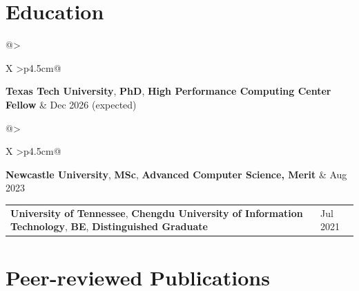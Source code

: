 \documentclass[10pt, letterpaper]{article}
\makeatletter
\newcommand{\datedentry}[2]{%
    \begin{tabularx}{\linewidth}{@{}>{\raggedright\arraybackslash}X
                                  >{\raggedleft\arraybackslash}p{4.5cm}@{}}
        #1 & #2
    \end{tabularx}%
}
\makeatother
\begin{document}
\section{Education}

\datedentry{\textbf{Texas Tech University}, \textbf{PhD}, \textbf{High Performance Computing Center Fellow}}{Dec 2026 (expected)}

\vspace{0.2cm}
\datedentry{\textbf{Newcastle University}, \textbf{MSc}, \textbf{Advanced Computer Science, Merit}}{Aug 2023}

\vspace{0.2cm}
\datedentry{\textbf{University of Tennessee}, \textbf{Chengdu University of Information Technology}, \textbf{BE}, \textbf{Distinguished Graduate}}{Jul 2021}

\section{Peer-reviewed Publications}
\end{document}
